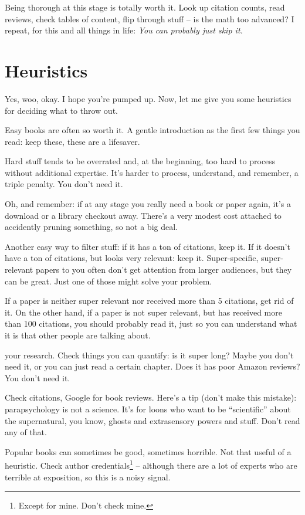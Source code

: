 Being thorough at this stage is totally worth it. Look up citation counts, read
reviews, check tables of content, flip through stuff -- is the math too advanced?
I repeat, for this and all things in life: \textit{You can probably just skip
  it.}

\section{Heuristics}

Yes, woo, okay. I hope you're pumped up. Now, let me give you some heuristics
for deciding what to throw out.

Easy books are often so worth it. A gentle introduction as the first few things
you read: keep these, these are a lifesaver.

Hard stuff tends to be overrated and, at the beginning, too hard to process
without additional expertise. It's harder to process, understand, and
remember, a triple penalty. You don't need it.

Oh, and remember: if at any stage you really need a book or paper again, it's a
download or a library checkout away. There's a very modest cost attached to
accidently pruning something, so not a big deal.

Another easy way to filter stuff: if it has a ton of citations, keep it. If it
doesn't have a ton of citations, but looks very relevant: keep
it. Super-specific, super-relevant papers to you often don't get attention from
larger audiences, but they can be great. Just one of those might solve
your problem.

If a paper is neither super relevant nor received more than 5 citations, get rid
of it. On the other hand, if a paper is not super relevant, but has received
more than 100 citations, you should probably read it, just so you can understand
what it is that other people are talking about. 

 your research. Check things you can quantify: is it
super long? Maybe you don't need it, or you can just read a certain
chapter. Does it has poor Amazon reviews? You don't need it.

Check citations, Google for book reviews. Here's a tip (don't make this mistake):
parapsychology is not a science. It's for loons who want to be ``scientific'' about the supernatural, you know, ghosts and extrasensory powers and
stuff. Don't read any of that.

Popular books can sometimes be good, sometimes horrible. Not that useful of a heuristic. Check author credentials\footnote{Except for mine. Don't check mine.} -- although there are a lot of experts who
are terrible at exposition, so this is a noisy signal. 

